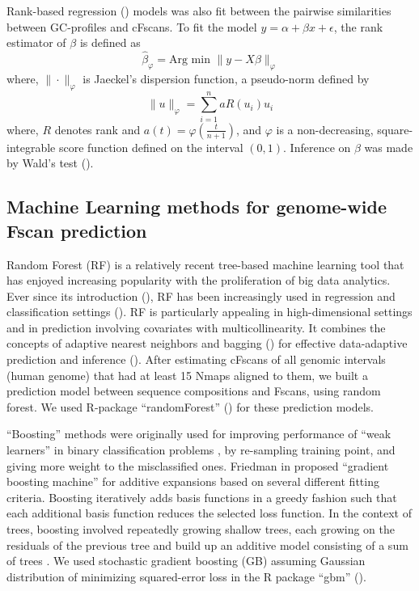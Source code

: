 Rank-based regression (\cite{Kloke_McKean_2012_R}) models was also fit between the pairwise similarities between GC-profiles and cFscans. To fit the model $ y = \alpha + \beta x + \epsilon$, the rank estimator of $\beta$ is defined as 
\begin{equation}
\hat{\beta}_{\varphi} = \text{Arg min } \| y - X\beta\|_{\varphi}
\end{equation}
where, $\| \cdot \|_{\varphi}$ is Jaeckel’s dispersion function, a pseudo-norm defined by
\[ \| u \|_{\varphi} = \sum\limits_{i=1}^n a R(u_i)u_i\]
where, $R$ denotes rank and $a(t) = \varphi(\frac{t}{n+1})$, and $\varphi$ is a non-decreasing, square-integrable score function defined on the interval $(0, 1)$. Inference on $\beta$ was made by Wald's test (\cite{Hettmansperger_etal_2010_Robust}). 

\subsection{Machine Learning methods for genome-wide Fscan prediction} \label{Sec4_ML}
Random Forest (RF) is a relatively recent tree-based machine learning tool that has enjoyed increasing popularity with the proliferation of big data analytics. Ever since its introduction (\cite{Breiman_2001_ML}), RF has been increasingly used in regression and classification settings (\cite{Efron_Hastie_2016}). RF is particularly appealing in high-dimensional settings and in prediction involving covariates with multicollinearity. It combines the concepts of adaptive nearest neighbors and bagging (\cite{Breiman_1996_ML}) for effective data-adaptive prediction and inference (\cite{Chen_Ishwaran_2012_Genomics}). After estimating cFscans of all genomic intervals (human genome) that had at least 15 Nmaps aligned to them, we built a prediction model between sequence compositions and Fscans, using random forest. We used R-package ``randomForest'' (\cite{Liaw_Wiener_2002_R}) for these prediction models. 

``Boosting'' methods were originally used for improving performance of ``weak learners'' in binary classification problems \cite{Efron_Hastie_2016}, by re-sampling training point, and giving more weight to the misclassified ones. Friedman in \cite{Friedman_2001_AnnStat} proposed ``gradient boosting machine'' for additive expansions based on several different fitting criteria. Boosting iteratively adds basis functions in a greedy fashion such that each additional basis function reduces the selected loss function. In the context of trees, boosting involved repeatedly growing shallow trees, each growing on the residuals of the previous tree and build up an additive model consisting of a sum of trees \cite{Efron_Hastie_2016}. We used stochastic gradient boosting (GB) assuming Gaussian distribution of minimizing squared-error loss in the R package ``gbm'' (\cite{Ridgeway_2006_R-gbm}). 


